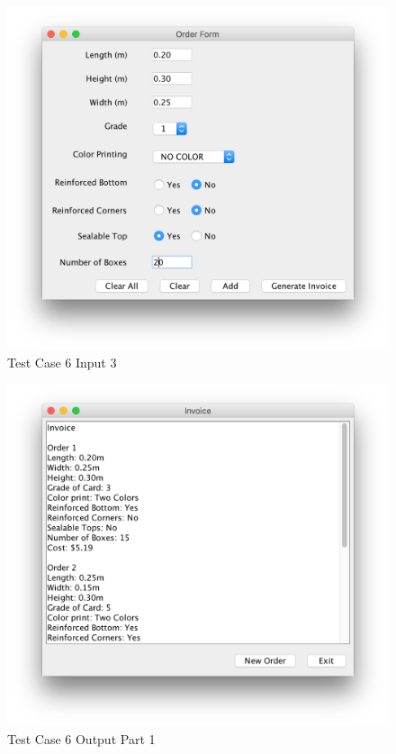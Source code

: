 \documentclass[12pt]{article}
\begin{document}
\begin{figure}[H]
	\includegraphics[width=\linewidth]{./screenshots/test_case_6_order3_input.png}
	\caption{Test Case 6 Input 3}
	\label{test_case_6_input_3}
\end{figure}
\begin{figure}[H]
	\includegraphics[width=\linewidth]{./screenshots/test_case_6_output_part1.png}
	\caption{Test Case 6 Output Part 1}
	\label{test_case_6_output}
\end{figure}
\end{document}
